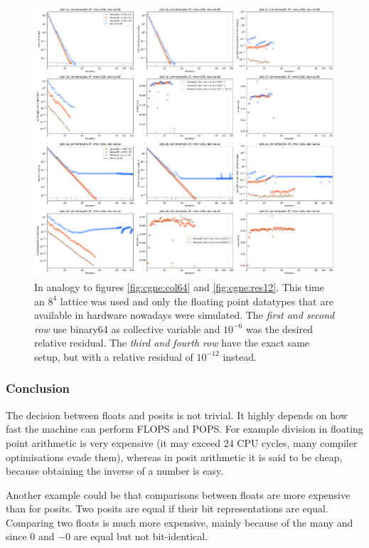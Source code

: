 \documentclass{article}
\theoremstyle{plain} %
\theoremstyle{convention} %
\theoremstyle{remark} %
\numberwithin{equation}{section}
\begin{document}
\begin{figure}[h]
    \centering
    \includegraphics[width=1.0\textwidth]{plots/cgne_8x8x8x8_new}
    \caption{In analogy to figures \ref{fig:cgne:col64} and \ref{fig:cgne:res12}. This time an $8^4$ lattice was used and only the floating point datatypes that are available in hardware nowadays were simulated. The \textit{first and second row} use \gls{binary64} as collective variable and $10^{-6}$ was the desired relative residual. The \textit{third and fourth row} have the exact same setup, but with a relative residual of $10^{-12}$ instead.}
    \label{fig:cgne8}
\end{figure}

\subsubsection{Conclusion}

The decision between floats and posits is not trivial. It highly depends on how fast the machine can perform \acrshort{FLOPS} and \acrshort{POPS}. For example division in floating point arithmetic is very expensive (it may exceed \num{24} CPU cycles, many compiler optimisations evade them), whereas in posit arithmetic it is said to be cheap, because obtaining the inverse of a number is easy.

Another example could be that comparisons between floats are more expensive than for posits. Two posits are equal if their bit representations are equal. Comparing two floats is much more expensive, mainly because of the many  and since $0$ and $-0$ are equal but not bit-identical.
\end{document}
